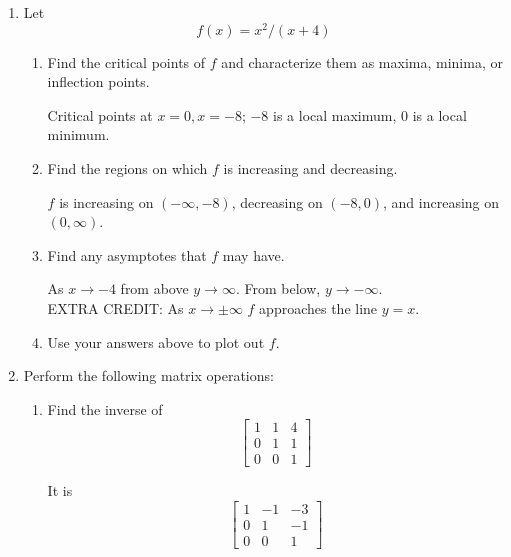 \documentclass[11pt]{article}
\begin{document}
\begin{enumerate}
Rearranging, we get ${1\over 2}|x-x_o|<\epsilon$ when $|x-x_o|<\delta$.  

Setting $\delta={2} \epsilon$ proves the result.

\vspace{.2in}
\item Let $$f(x)=x^2/(x+4)$$
\begin{enumerate}
\item Find the critical points of $f$ and characterize them as maxima, minima, or inflection points.

Critical points at $x=0, x=-8$; $-8 $ is a local maximum, $0$ is a local minimum.
\item Find the regions on which $f$ is increasing and decreasing.

$f$ is increasing on $(-\infty, -8)$, decreasing on $(-8, 0)$, and increasing on $(0, \infty)$.

\item Find any asymptotes that $f$ may have.

 As $x\rightarrow -4$ from above $y\rightarrow \infty$.  From below, $y\rightarrow -\infty$.  \\EXTRA CREDIT:  As $x\rightarrow \pm\infty$ $f$ approaches the line $y=x$.
\item Use your answers above to plot out $f$.

\begin{center}
 
 \end{center}
 
\end{enumerate}

\item Perform the following matrix operations:

\begin{enumerate}
\item Find the inverse of $$\begin{bmatrix}1 & 1& 4\\ 0& 1& 1\\0&0&1
\end{bmatrix}$$

 It is $$\begin{bmatrix}1 & -1& -3\\ 0& 1& -1\\0&0&1 \end{bmatrix}$$


\end{enumerate}
\end{enumerate}
\end{document}
